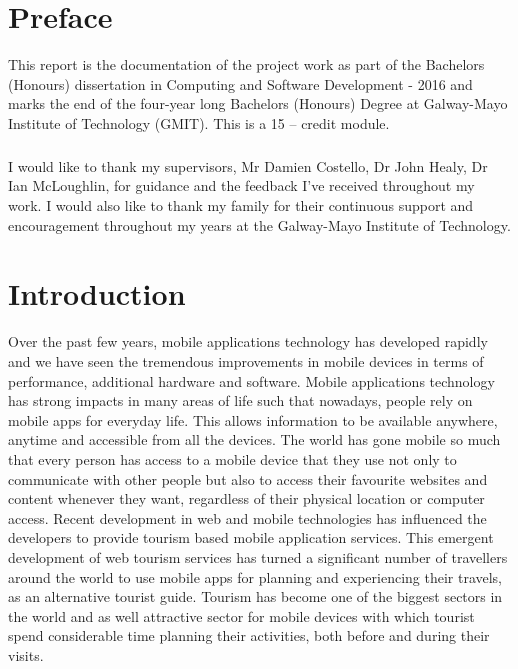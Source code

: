 
\chapter*{Preface}
This report is the documentation of the project work as part of the Bachelors (Honours) dissertation in Computing and Software Development - 2016 and marks the end of the four-year long Bachelors (Honours) Degree at Galway-Mayo Institute of Technology (GMIT). This is a 15 – credit module.

\paragraph{}
I would like to thank my supervisors, Mr Damien Costello, Dr John Healy, Dr Ian McLoughlin, for guidance and the feedback I’ve received throughout my work. 
I would also like to thank my family for their continuous support and encouragement throughout my years at the Galway-Mayo Institute of Technology.


\chapter{Introduction}
Over the past few years, mobile applications technology has developed rapidly and we have seen the tremendous improvements in mobile devices in terms of performance, additional hardware and software. 
Mobile applications technology has strong impacts in many areas of life such that nowadays, people rely on mobile apps for everyday life. This allows information to be available anywhere, anytime and accessible from all the devices.  The world has gone mobile so much that every person has access to a mobile device that they use not only to communicate with other people but also to access their favourite websites and content whenever they want, regardless of their physical location or computer access. Recent development in web and mobile technologies has influenced the developers to provide tourism based mobile application services. This emergent development of web tourism services has turned a significant number of travellers around the world to use mobile apps for planning and experiencing their travels, as an alternative tourist guide.
Tourism has become one of the biggest sectors in the world and as well attractive sector for mobile devices with which tourist spend considerable time planning their activities, both before and during their visits.

